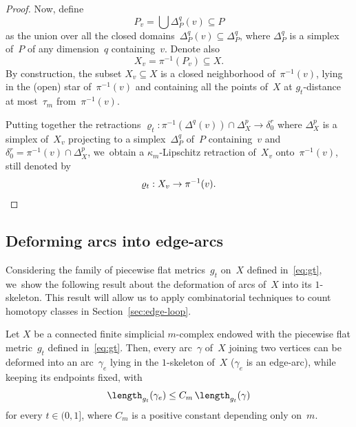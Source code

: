 \begin{proof}
Now, define
\begin{equation} \label{eq:Pv}
P_v = \bigcup \Delta_P^q(v) \subseteq P
\end{equation}
as the union over all the closed domains~$\Delta_P^q(v) \subseteq \Delta_P^q$, where $\Delta_P^q$ is a simplex of~$P$ of any dimension~$q$ containing~$v$.
Denote also
\begin{equation} \label{eq:Xv}
X_v = \pi^{-1}(P_v) \subseteq X.
\end{equation}
By construction, the subset $X_v \subseteq X$ is a closed neighborhood of~$\pi^{-1}(v)$, lying in the (open) star of~$\pi^{-1}(v)$ and containing all the points of~$X$ at $g_t$-distance at most~$\tau_m$ from~$\pi^{-1}(v)$.

Putting together the retractions $\varrho_t : \pi^{-1}(\Delta^q(v)) \cap \Delta_X^p \to \delta_0^r$ where $\Delta_X^p$ is a simplex of~$X_v$ projecting to a simplex~$\Delta_P^q$ of~$P$ containing~$v$ and $\delta_0^r= \pi^{-1}(v) \cap \Delta_X^p$, we~obtain a $\kappa_m$-Lipschitz retraction of~$X_v$ onto~$\pi^{-1}(v)$, still denoted by
\[
\varrho_t:X_v \to \pi^{-1}(v).\qedhere
\]
\end{proof}

\subsection{Deforming arcs into edge-arcs} \label{sec:deforming}

Considering the family of piecewise flat metrics~$g_t$ on~$X$ defined in~\eqref{eq:gt}, we~show the following result about the deformation of arcs of~$X$ into its $1$-skeleton.
This result will allow us to apply combinatorial techniques to count homotopy classes in Section~\ref{sec:edge-loop}.

\begin{proposition} \label{prop:deforming}
Let $X$ be a connected finite simplicial $m$\nobreakdash-complex endowed with the piecewise flat metric~$g_t$ defined in~\eqref{eq:gt}.
Then, every arc~$\gamma$ of~$X$ joining two vertices can be deformed into an arc~$\gamma_e$ lying in the $1$-skeleton of~$X$ (\ie $\gamma_e$ is an edge-arc), while keeping its endpoints fixed, with
\begin{equation} \label{eq:deforming}
\length_{g_t}(\gamma_e) \leq C_m \, \length_{g_t}(\gamma)
\end{equation}
for every $t \in (0,1]$, where $C_m$ is a positive constant depending only on~$m$.
\end{proposition}

